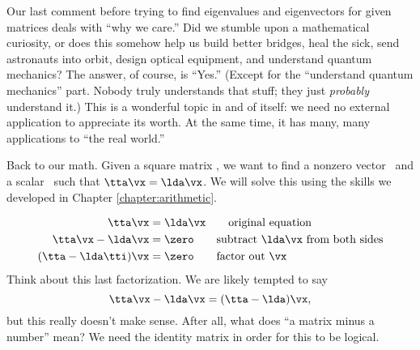 Our last comment before trying to find eigenvalues and eigenvectors for given matrices deals with ``why we care.'' Did we stumble upon a mathematical curiosity, or does this somehow help us build better bridges, heal the sick, send astronauts into orbit, design optical equipment, and understand quantum mechanics? The answer, of course, is ``Yes.'' (Except for the ``understand quantum mechanics'' part. Nobody truly understands that stuff; they just \textit{probably} understand it.) This is a wonderful topic in and of itself: we need no external application to appreciate its worth. At the same time, it has many, many applications to ``the real world.''


Back to our math. Given a square matrix \tta, we want to find a nonzero vector \vx\ and a scalar \lda\ such that $\tta\vx = \lda\vx$. We will solve this using the skills we developed in Chapter \ref{chapter:arithmetic}.

\begin{align*}
\tta\vx & =  \lda\vx \tag*{original equation}\\
\tta\vx - \lda\vx & = \zero \tag*{subtract $\lda\vx$ from both sides}\\
(\tta-\lda\tti)\vx & = \zero \tag*{factor out \vx}\\
\end{align*}
Think about this last factorization. We are likely tempted to say 
\[
\tta\vx-\lda\vx = (\tta-\lda)\vx,
\]
but this really doesn't make sense. After all, what does ``a matrix minus a number'' mean? We need the identity matrix in order for this to be logical. 

